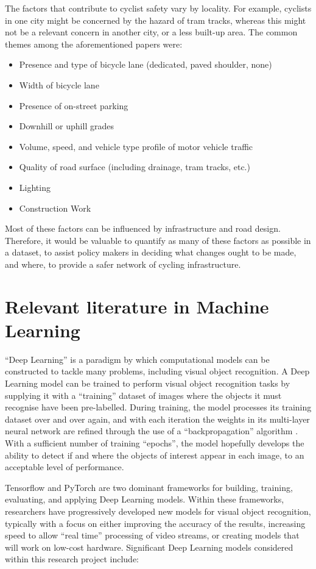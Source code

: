 \documentclass[11pt,twoside]{report}
\begin{document}
The factors that contribute to cyclist safety vary by locality.  For example, cyclists in one city might be concerned by the hazard of tram tracks, whereas this might not be a relevant concern in another city, or a less built-up area.  The common themes among the aforementioned papers were:
\begin{itemize}
\item{Presence and type of bicycle lane (dedicated, paved shoulder, none)}
\item{Width of bicycle lane}
\item{Presence of on-street parking}
\item{Downhill or uphill grades}
\item{Volume, speed, and vehicle type profile of motor vehicle traffic}
\item{Quality of road surface (including drainage, tram tracks, etc.)}
\item{Lighting}
\item{Construction Work}
\end{itemize}
Most of these factors can be influenced by infrastructure and road design.  Therefore, it would be valuable to quantify as many of these factors as possible in a dataset, to assist policy makers in deciding what changes ought to be made, and where, to provide a safer network of cycling infrastructure.

\section{Relevant literature in Machine Learning}

``Deep Learning'' is a paradigm by which computational models can be constructed to tackle many problems, including visual object recognition.  A Deep Learning model can be trained to perform visual object recognition tasks by supplying it with a ``training'' dataset of images where the objects it must recognise have been pre-labelled.  During training, the model processes its training dataset over and over again, and with each iteration the weights in its multi-layer neural network are refined through the use of a ``backpropagation'' algorithm \cite{deeplearning}.  With a sufficient number of training ``epochs'', the model hopefully develops the ability to detect if and where the objects of interest appear in each image, to an acceptable level of performance.

Tensorflow \cite{TENSORFLOW2016A} \cite{TENSORFLOW2016B} and PyTorch \cite{pytorch} are two dominant frameworks for building, training, evaluating, and applying Deep Learning models.  Within these frameworks, researchers have progressively developed new models for visual object recognition, typically with a focus on either improving the accuracy of the results, increasing speed to allow ``real time'' processing of video streams, or creating models that will work on low-cost hardware.  Significant Deep Learning models considered within this research project include:
\end{document}
